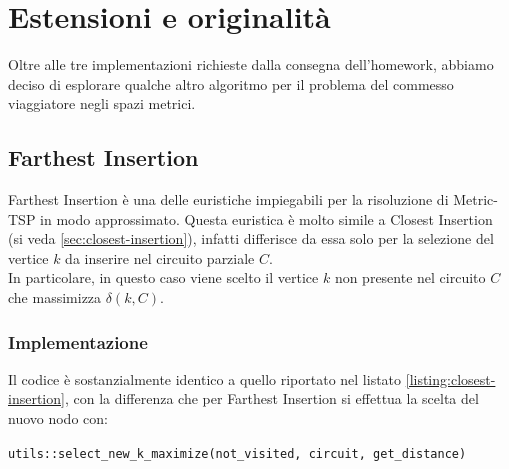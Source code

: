 \section{Estensioni e originalità}
\label{cap:extensions-and-originalities}

\noindent Oltre alle tre implementazioni richieste dalla consegna
dell'homework, abbiamo deciso di esplorare qualche altro algoritmo per il problema del commesso viaggiatore negli spazi metrici.\\

\subsection{Farthest Insertion}
\label{sec:farthest-insertion}

\noindent Farthest Insertion è una delle euristiche impiegabili per la
risoluzione di Metric-TSP in modo approssimato. Questa euristica è
molto simile a Closest Insertion (si veda
\ref{sec:closest-insertion}), infatti differisce da essa solo per la
selezione del vertice $k$ da inserire nel circuito parziale $C$.\\

\noindent In particolare, in questo caso viene scelto il vertice $k$
non presente nel circuito $C$ che massimizza $\delta (k, C)$.\\

\subsubsection{Implementazione}

\noindent Il codice è sostanzialmente identico a quello riportato nel
listato \ref{listing:closest-insertion}, con la differenza che per
Farthest Insertion si effettua la scelta del nuovo nodo con:

\begin{center}
\texttt{utils::select_new_k_maximize(not_visited, circuit, get_distance)}
\end{center}



